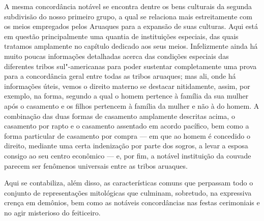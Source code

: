 A mesma concordância notável se encontra dentre os bens culturais da
segunda subdivisão do nosso primeiro grupo, a qual se relaciona mais
estreitamente com os meios empregados pelos Aruaques para a expansão de
suas culturas. Aqui está em questão principalmente uma quantia de
instituições especiais, das quais tratamos amplamente no capítulo
dedicado aos seus meios. Infelizmente ainda há muito poucas informações
detalhadas acerca das condições especiais das diferentes tribos
sul"-americanas para poder sustentar completamente uma prova para a
concordância geral entre todas as tribos aruaques; mas ali, onde há
informações úteis, vemos o direito materno se destacar nitidamente,
assim, por exemplo, na forma, segundo a qual o homem pertence à família
da sua mulher após o casamento e os filhos pertencem à família da
mulher e não à do homem. A combinação das duas formas de casamento
amplamente descritas acima, o casamento por rapto e o casamento
assentado em acordo pacífico, bem como a forma particular de casamento
por compra --- em que ao homem é concedido o direito, mediante uma certa
indenização por parte dos sogros, a levar a esposa consigo ao seu centro
econômico --- e, por fim, a notável instituição da couvade parecem ser
fenômenos universais entre as tribos aruaques.

Aqui se contabiliza, além disso, as características comuns que perpassam
todo o conjunto de representações mitológicas que culminam, sobretudo,
na expressiva crença em demônios, bem como as notáveis concordâncias nas
festas cerimoniais e no agir misterioso do feiticeiro.



